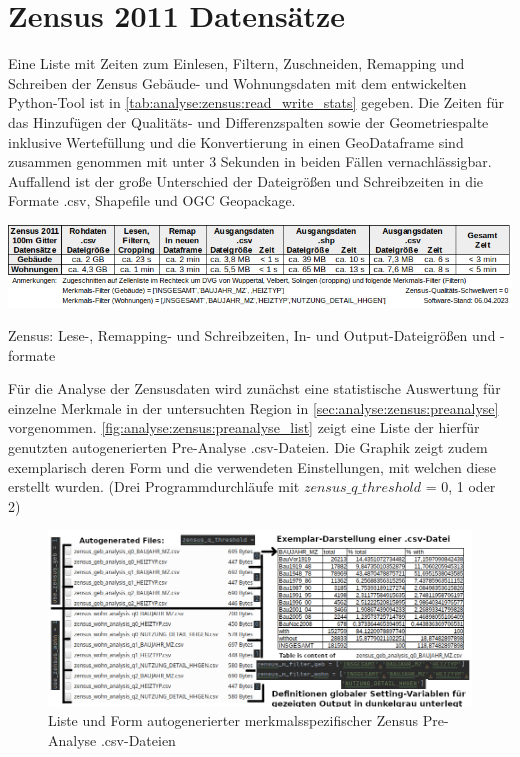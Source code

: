 	\section{Zensus 2011 Datensätze}
		Eine Liste mit Zeiten zum Einlesen, Filtern, Zuschneiden, Remapping und Schreiben der Zensus Gebäude- und Wohnungsdaten mit dem entwickelten Python-Tool ist in \autoref{tab:analyse:zensus:read_write_stats} gegeben. Die Zeiten für das Hinzufügen der Qualitäts- und Differenzspalten sowie der Geometriespalte inklusive Wertefüllung und die Konvertierung in einen GeoDataframe sind zusammen genommen mit unter 3 Sekunden in beiden Fällen vernachlässigbar. Auffallend ist der große Unterschied der Dateigrößen und Schreibzeiten in die Formate .csv, Shapefile und OGC Geopackage. 
		
		\begin{table}[h]
			\includegraphics[width=\linewidth]{./Medien/tables/read_write_stats/Zensus_read_write_stats.png}
			\caption{Zensus: Lese-, Remapping- und Schreibzeiten, In- und Output-Dateigrößen und -formate}
			\label{tab:analyse:zensus:read_write_stats}	
		\end{table}
		
		Für die Analyse der Zensusdaten wird zunächst eine statistische Auswertung für einzelne Merkmale in der untersuchten Region in \autoref{sec:analyse:zensus:preanalyse} vorgenommen. \autoref{fig:analyse:zensus:preanalyse_list} zeigt eine Liste der hierfür genutzten autogenerierten Pre-Analyse .csv-Dateien. Die Graphik zeigt zudem exemplarisch deren Form und die verwendeten Einstellungen, mit welchen diese erstellt wurden. (Drei Programmdurchläufe mit $zensus\_q\_threshold$ = 0, 1 oder 2)
		 		
		\begin{figure}[h]
			\includegraphics[width=\linewidth]{./Medien/own/zensus_preanalysis_list.png}
			\caption{Liste und Form autogenerierter merkmalsspezifischer Zensus Pre-Analyse .csv-Dateien}
			\label{fig:analyse:zensus:preanalyse_list}
		\end{figure}		
		
